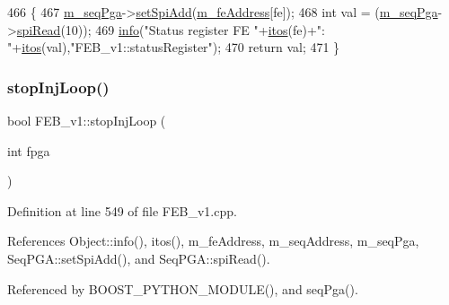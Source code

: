 \begin{DoxyCode}
466                                 \{  
467   \hyperlink{classFEB__v1_a6c7804ac86796f233a8393043adf2e77}{m\_seqPga}->\hyperlink{classSeqPGA_ac998ce3a6d9b5f2e88cc8393f8c1df53}{setSpiAdd}(\hyperlink{classFEB__v1_a4e1945c2d5b434125f375e9d0fc6d99f}{m\_feAddress}[fe]);
468   \textcolor{keywordtype}{int} val = (\hyperlink{classFEB__v1_a6c7804ac86796f233a8393043adf2e77}{m\_seqPga}->\hyperlink{classSeqPGA_ab3d0e5e5d4014bc7a92588a76b8713d4}{spiRead}(10));
469   \hyperlink{classObject_a644fd329ea4cb85f54fa6846484b84a8}{info}(\textcolor{stringliteral}{"Status register FE "}+\hyperlink{Tools_8h_af330027dbdafb9a30768b3613c553e60}{itos}(fe)+\textcolor{stringliteral}{": "}+\hyperlink{Tools_8h_af330027dbdafb9a30768b3613c553e60}{itos}(val),\textcolor{stringliteral}{"FEB\_v1::statusRegister"});
470   \textcolor{keywordflow}{return} val;
471 \}
\end{DoxyCode}
\mbox{\label{classFEB__v1_abfd23d8fbcea0415a7e8401110869a78}} 
\subsubsection{\texorpdfstring{stop\+Inj\+Loop()}{stopInjLoop()}}
{\footnotesize\ttfamily bool F\+E\+B\+\_\+v1\+::stop\+Inj\+Loop (\begin{DoxyParamCaption}\item[{int}]{fpga }\end{DoxyParamCaption})}



Definition at line 549 of file F\+E\+B\+\_\+v1.\+cpp.



References Object\+::info(), itos(), m\+\_\+fe\+Address, m\+\_\+seq\+Address, m\+\_\+seq\+Pga, Seq\+P\+G\+A\+::set\+Spi\+Add(), and Seq\+P\+G\+A\+::spi\+Read().



Referenced by B\+O\+O\+S\+T\+\_\+\+P\+Y\+T\+H\+O\+N\+\_\+\+M\+O\+D\+U\+L\+E(), and seq\+Pga().


